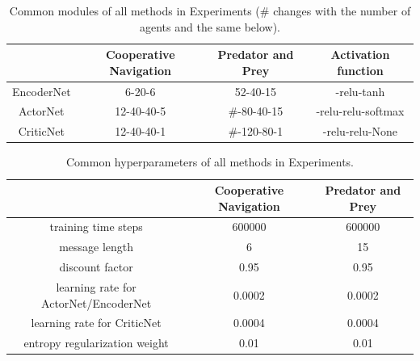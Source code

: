 \documentclass[letterpaper]{article} %
\begin{document}
\begin{table}[h]
  \centering
  \caption{Common modules of all methods in Experiments (\# changes with the number of agents and the same below).}
    \begin{tabular}{|c|c|c|c|}
    \hline
    \hline
     ~ & Cooperative Navigation & Predator and Prey & Activation function \\
    \hline
     EncoderNet & 6-20-6 & 52-40-15 &  -relu-tanh \\
    \hline
     ActorNet & 12-40-40-5 & \#-80-40-15 &  -relu-relu-softmax \\
    \hline
     CriticNet & 12-40-40-1 & \#-120-80-1 &  -relu-relu-None \\
    \hline
    \hline
    \end{tabular}%
  \label{tab:strucommon}%
\end{table}%
\begin{table}[h]
  \centering
  \caption{Common hyperparameters of all methods in Experiments.}
    \begin{tabular}{|c|c|c|}
    \hline
    \hline
     ~ & Cooperative Navigation & Predator and Prey  \\
    \hline
     training time steps & 600000 & 600000  \\
    \hline
     message length & 6 & 15  \\
    \hline
     discount factor & 0.95 & 0.95  \\
    \hline
    learning rate for ActorNet/EncoderNet & 0.0002 & 0.0002  \\
    \hline
    learning rate for CriticNet & 0.0004 & 0.0004   \\
    \hline
    entropy regularization  weight & 0.01 & 0.01    \\
    \hline
    \hline
    \end{tabular}%
  \label{tab:hypercommon}%
\end{table}%
\end{document}
